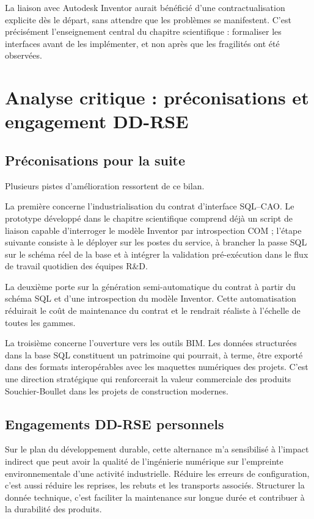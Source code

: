 La liaison avec Autodesk Inventor aurait bénéficié d'une contractualisation explicite dès le départ, sans attendre que les problèmes se manifestent. C'est précisément l'enseignement central du chapitre scientifique : formaliser les interfaces avant de les implémenter, et non après que les fragilités ont été observées.

\section{Analyse critique : préconisations et engagement DD-RSE}

\subsection{Préconisations pour la suite}

Plusieurs pistes d'amélioration ressortent de ce bilan.

La première concerne l'industrialisation du contrat d'interface SQL--CAO. Le prototype développé dans le chapitre scientifique comprend déjà un script de liaison capable d'interroger le modèle Inventor par introspection COM ; l'étape suivante consiste à le déployer sur les postes du service, à brancher la passe SQL sur le schéma réel de la base et à intégrer la validation pré-exécution dans le flux de travail quotidien des équipes R\&D.

La deuxième porte sur la génération semi-automatique du contrat à partir du schéma SQL et d'une introspection du modèle Inventor. Cette automatisation réduirait le coût de maintenance du contrat et le rendrait réaliste à l'échelle de toutes les gammes.

La troisième concerne l'ouverture vers les outils BIM. Les données structurées dans la base SQL constituent un patrimoine qui pourrait, à terme, être exporté dans des formats interopérables avec les maquettes numériques des projets. C'est une direction stratégique qui renforcerait la valeur commerciale des produits Souchier-Boullet dans les projets de construction modernes.

\subsection{Engagements DD-RSE personnels}

Sur le plan du développement durable, cette alternance m'a sensibilisé à l'impact indirect que peut avoir la qualité de l'ingénierie numérique sur l'empreinte environnementale d'une activité industrielle. Réduire les erreurs de configuration, c'est aussi réduire les reprises, les rebuts et les transports associés. Structurer la donnée technique, c'est faciliter la maintenance sur longue durée et contribuer à la durabilité des produits.

